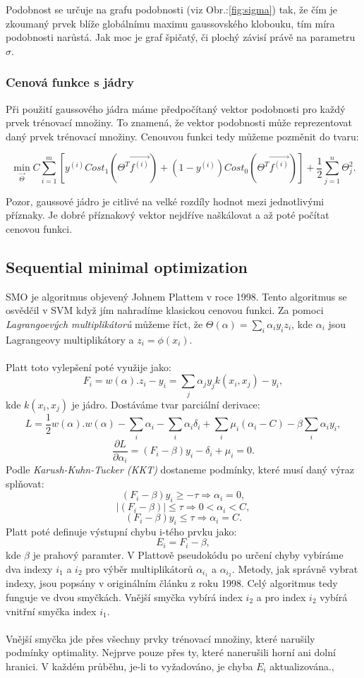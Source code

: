 \documentclass[a4]{article}
\begin{document}
\noindent Podobnost se určuje na grafu podobnosti (viz Obr.:\ref{fig:sigma}) tak, že čím je zkoumaný prvek blíže globálnímu maximu gaussovského klobouku, tím míra podobnosti narůstá. Jak moc je graf špičatý, či plochý závisí právě na parametru $\sigma$.

\subsubsection{Cenová funkce s jádry}
Při použití gaussového jádra máme předpočítaný vektor podobnosti pro každý prvek trénovací množiny. To znamená, že vektor podobnosti může reprezentovat daný prvek trénovací množiny. Cenouvou funkci tedy můžeme pozměnit do tvaru:

$$\min_{\vec{\Theta}} C \sum_{i=1}^{m}[y^{(i)} Cost_1 (\Theta^T \vec{f^{(i)}})+(1-y^{(i)}) Cost_0 (\Theta^T \vec{f^{(i)}})] + \frac{1}{2} \sum_{j=1}^{n}\Theta_{j}^{2}.$$

\noindent Pozor, gaussové jádro je citlivé na velké rozdíly hodnot mezi jednotlivými příznaky. Je dobré příznakový vektor nejdříve naškálovat a až poté počítat cenovou funkci.

\subsection{Sequential minimal optimization}
SMO je algoritmus objevený Johnem Plattem v roce 1998. Tento algoritmus se osvědčil v SVM když jím nahradíme klasickou cenovou funkci. Za pomoci \textit{Lagrangoevých multiplikátorů} můžeme říct, že $\Theta(\alpha)=\sum_{i}\alpha_{i}y_{i}z_{i}$, kde $\alpha_i$ jsou Lagrangeovy multiplikátory a $z_{i}=\phi(x_{i})$.
\\\\
Platt toto vylepšení poté využije jako:
$$
F_i =w(\alpha) . z_i - y_i = \sum_{j}\alpha_{j}y_{j}k(x_i,x_j)-y_{i},
$$
kde $k(x_i,x_j)$ je jádro. Dostáváme tvar parciální derivace:
$$
L = \frac{1}{2}w(\alpha).w(\alpha)-\sum_{i}\alpha_{i}-\sum_{i}\alpha_{i}\delta_{i}+\sum_{i}\mu_{i}(\alpha_{i}-C)-\beta\sum_{i}\alpha_{i}y_{i},
$$
$$
\frac{\partial L}{\partial \alpha_{i}}=(F_{i}-\beta)y_{i}-\delta_{i}+\mu_{i}=0.
$$
Podle \textit{Karush-Kuhn-Tucker (KKT)} dostaneme podmínky, které musí daný výraz splňovat:
$$
(F_i-\beta)y_{i} \geq -\tau \Rightarrow \alpha_{i} = 0,
$$
$$
|(F_i-\beta)| \leq \tau \Rightarrow 0 < \alpha_{i} < C,
$$
$$
(F_i-\beta)y_{i} \leq \tau \Rightarrow \alpha_{i} = C.
$$
Platt poté definuje výstupní chybu i-tého prvku jako:
$$
E_{i} = F_{i} - \beta,
$$
kde $\beta$ je prahový paramter. V Plattově pseudokódu po určení chyby vybíráme dva indexy $i_1$ a $i_2$ pro výběr multiplikátorů $\alpha_{i_1}$ a $\alpha_{i_2}$. Metody, jak správně vybrat indexy, jsou popsány v originálním článku z roku 1998. Celý algoritmus tedy funguje ve dvou smyčkách. Vnější smyčka vybírá index $i_2$ a pro index $i_2$ vybírá vnitřní smyčka index $i_1$.
\\\\
Vnější smyčka jde přes všechny prvky trénovací množiny, které narušily podmínky optimality. Nejprve pouze přes ty, které nanerušili horní ani dolní hranici. V každém průběhu, je-li to vyžadováno, je chyba $E_i$ aktualizována.\cite{smo_platt},\cite{andrew}
\end{document}
